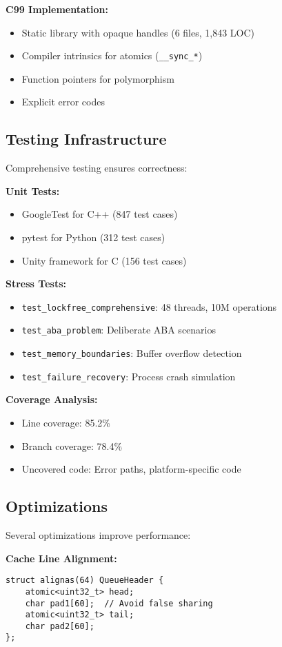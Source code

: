 \documentclass[letterpaper,twocolumn,10pt]{article}
\begin{document}
\textbf{C99 Implementation:}
\begin{itemize}
\item Static library with opaque handles (6 files, 1,843 LOC)
\item Compiler intrinsics for atomics (\texttt{\_\_sync\_*})
\item Function pointers for polymorphism
\item Explicit error codes
\end{itemize}

\subsection{Testing Infrastructure}

Comprehensive testing ensures correctness:

\textbf{Unit Tests:}
\begin{itemize}
\item GoogleTest for C++ (847 test cases)
\item pytest for Python (312 test cases)
\item Unity framework for C (156 test cases)
\end{itemize}

\textbf{Stress Tests:}
\begin{itemize}
\item \texttt{test\_lockfree\_comprehensive}: 48 threads, 10M operations
\item \texttt{test\_aba\_problem}: Deliberate ABA scenarios
\item \texttt{test\_memory\_boundaries}: Buffer overflow detection
\item \texttt{test\_failure\_recovery}: Process crash simulation
\end{itemize}

\textbf{Coverage Analysis:}
\begin{itemize}
\item Line coverage: 85.2\%
\item Branch coverage: 78.4\%
\item Uncovered code: Error paths, platform-specific code
\end{itemize}

\subsection{Optimizations}

Several optimizations improve performance:

\textbf{Cache Line Alignment:}
\begin{lstlisting}
struct alignas(64) QueueHeader {
    atomic<uint32_t> head;
    char pad1[60];  // Avoid false sharing
    atomic<uint32_t> tail;
    char pad2[60];
};
\end{lstlisting}
\end{document}
